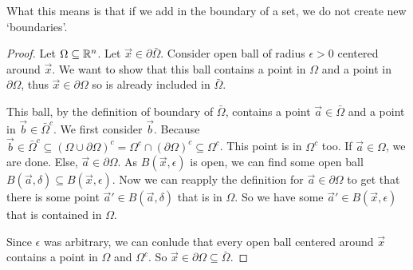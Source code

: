 What this means is that if we add in the boundary of a set, we do not create new `boundaries'.
\begin{proof}
    Let $\Omega\subseteq \mathbb{R}^n$. Let $\vec{x}\in \partial \bar{\Omega}$. Consider open ball of radius $\epsilon>0$ centered around $\vec{x}$. We want to show that this ball contains a point in $\Omega$ and a point in $\partial \Omega$, thus $\vec{x}\in\partial \Omega$ so is already included in $\bar{\Omega}$. 
    
    This ball, by the definition of boundary of $\bar{\Omega}$, contains a point $\vec{a}\in\bar{\Omega}$ and a point in $\vec{b}\in\bar{\Omega}^c$. We first consider $\vec{b}$. Because $\vec{b}\in\bar{\Omega}^c\subseteq (\Omega \cup \partial\Omega)^c = \Omega^c \cap (\partial\Omega)^c\subseteq \Omega^c$. This point is in $\Omega^c$ too.
    If $\vec{a}\in \Omega$, we are done. Else, $\vec{a}\in\partial \Omega$. As $B(\vec{x},\epsilon)$ is open, we can find some open ball $B(\vec{a},\delta)\subseteq B(\vec{x},\epsilon)$. Now we can reapply the definition for $\vec{a}\in\partial \Omega$ to get that there is some point $\vec{a}'\in B(\vec{a},\delta)$ that is in $\Omega$. So we have some $\vec{a}'\in B(\vec{x},\epsilon)$ that is contained in $\Omega$.

    Since $\epsilon$ was arbitrary, we can conlude that every open ball centered around $\vec{x}$ contains a point in $\Omega$ and $\Omega^c$. So $\vec{x}\in\partial \Omega\subseteq \bar{\Omega}$.
\end{proof}

\exercises
\begin{exerciselist}
    \item \todo
\end{exerciselist}
